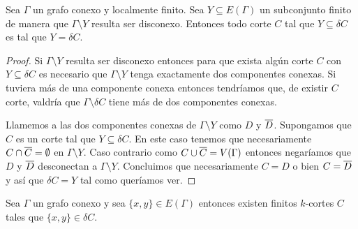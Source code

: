 \documentclass[tesis.tex]{subfiles}
\begin{document}
\begin{lema}\label{lema_corte_disconexo_vertices}
	Sea $\Gamma$ un grafo conexo y localmente finito.
	Sea $Y \subseteq E(\Gamma)$ un subconjunto finito de manera que $\Gamma \setminus Y$ resulta ser disconexo.
	Entonces todo corte $C$ tal que $Y \subseteq \delta C$ es tal que $Y = \delta C$.
\end{lema}

\begin{proof}
	Si $\Gamma \setminus Y$ resulta ser disconexo entonces para que exista algún corte $C$ con $Y \subseteq \delta C$ es necesario que $\Gamma \setminus Y$ tenga exactamente dos componentes conexas.
	Si tuviera más de una componente conexa entonces tendríamos que, de existir $C$ corte, valdría que $\Gamma \setminus \delta C$ tiene más de dos componentes conexas.	
	
	Llamemos a las dos componentes conexas de $\Gamma \setminus Y$ como $D$ y  $\overline D$.
	Supongamos que $C$ es un corte tal que $Y \subseteq \delta C$. 
	En este caso tenemos que necesariamente $C \cap \overline C = \emptyset$ en $\Gamma \setminus Y$.
	Caso contrario como $C \cup \overline C = V(\Gamma)$ entonces negaríamos que $D$ y $\overline D$ desconectan a $\Gamma \setminus Y$.
	Concluimos que necesariamente $C = D$ o bien $C = \overline D$ y así que $\delta C = Y$ tal como queríamos ver.
\end{proof}

\begin{prop}\label{lema_aristas_finitos_kcortes}
	Sea $\Gamma$ un grafo conexo y sea $\{x,y\} \in E(\Gamma)$ entonces existen finitos $k$-cortes $C$ tales que $\{x,y\} \in \delta C$.
\end{prop}
\end{document}
